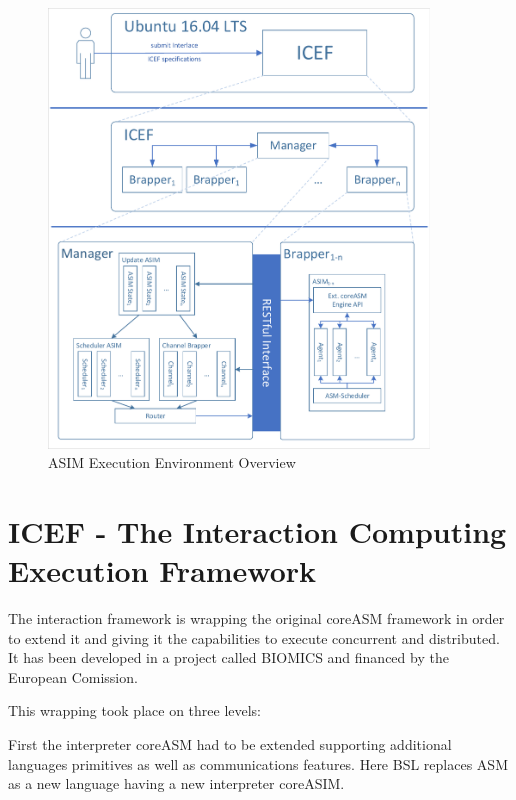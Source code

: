 \begin{figure}[htbp]
  \centering
  \includegraphics[width=0.9\textwidth, clip, trim=1mm 1mm 1mm 1mm]{Figures/environment_asim}
  \caption{ASIM Execution Environment Overview}
  \label{fig:exec-env-asim}
\end{figure}


\section{ICEF - The Interaction Computing Execution Framework}
\label{sec:icef-intro}


The interaction framework is wrapping the original coreASM framework in order to extend it and giving it the capabilities to execute concurrent and distributed. It has been developed in a project called BIOMICS and financed by the European Comission.

This wrapping took place on three levels:

First the interpreter coreASM had to be extended supporting additional languages primitives as well as communications features. Here BSL replaces ASM as a new language having a new interpreter coreASIM.


